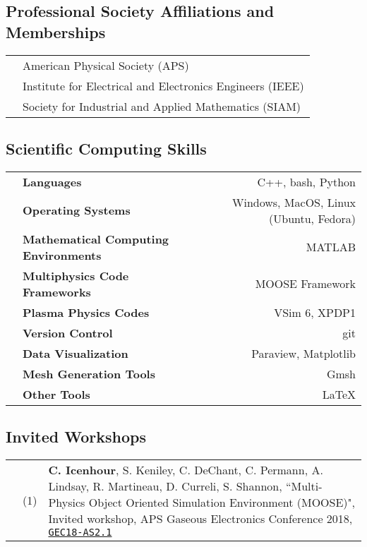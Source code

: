 \documentclass{article}
\begin{document}
\subsection*{Professional Society Affiliations and Memberships}

\begin{tabularx}{\textwidth}{l l}
	\hspace{2em} & American Physical Society (APS) \\
				 & Institute for Electrical and Electronics Engineers (IEEE) \\
				 & Society for Industrial and Applied Mathematics (SIAM)
\end{tabularx}

\subsection*{Scientific Computing Skills}

	\begin{tabularx}{\textwidth}{l X r}
		\hspace {2em} & \textbf{Languages} & C++, bash, Python \\
					  & \textbf{Operating Systems} & Windows, MacOS, Linux (Ubuntu, Fedora) \\
					  & \textbf{Mathematical Computing Environments} & MATLAB \\
					  & \textbf{Multiphysics Code Frameworks} & MOOSE Framework \\
					  & \textbf{Plasma Physics Codes} & VSim 6, XPDP1 \\
					  & \textbf{Version Control} & git \\
					  & \textbf{Data Visualization} & Paraview, Matplotlib \\
					  & \textbf{Mesh Generation Tools} & Gmsh \\
					  & \textbf{Other Tools} & \LaTeX
	\end{tabularx}

\subsection*{Invited Workshops}

	\begin{tabularx}{\textwidth}{l l X}
		\hspace{2em}
			& (1)  & \textbf{C. Icenhour}, S. Keniley, C. DeChant, C. Permann, A. Lindsay, R. Martineau, D. Curreli, S. Shannon, ``Multi-Physics Object Oriented Simulation Environment (MOOSE)", Invited workshop, APS Gaseous Electronics Conference 2018, \href{http://meetings.aps.org/link/BAPS.2018.GEC.AS2.1}{\texttt{GEC18-AS2.1}}
	\end{tabularx}
\end{document}
